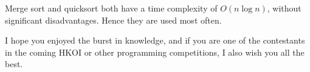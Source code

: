 Merge sort and quicksort both have a time complexity of $O(n\log n)$, without significant disadvantages. Hence they are used most often. 


I hope you enjoyed the burst in knowledge, and if you are one of the contestants in the coming HKOI or other programming competitions, I also wish you all the best.